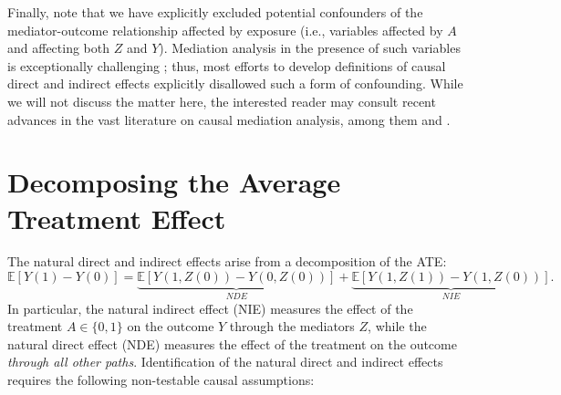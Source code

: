 \documentclass[
  12pt, krantz2,
]{krantz}
\theoremstyle{definition}
\theoremstyle{definition}
\theoremstyle{definition}
\newcommand{\E}{\mathbb{E}}
\newcommand{\1}{\mathbbm{1}}
\begin{document}
Finally, note that we have explicitly excluded potential confounders of the
mediator-outcome relationship affected by exposure (i.e., variables affected by
\(A\) and affecting both \(Z\) and \(Y\)). Mediation analysis in the presence of such
variables is exceptionally challenging \citep{avin2005identifiability}; thus, most
efforts to develop definitions of causal direct and indirect effects explicitly
disallowed such a form of confounding. While we will not discuss the matter
here, the interested reader may consult recent advances in the vast literature
on causal mediation analysis, among them \citet{diaz2020nonparametric} and
\citet{hejazi2021nonparametric}.

\hypertarget{decomposing-the-average-treatment-effect}{%
\section{Decomposing the Average Treatment Effect}\label{decomposing-the-average-treatment-effect}}

The natural direct and indirect effects arise from a decomposition of the ATE:
\begin{equation*}
  \E[Y(1) - Y(0)] =
    \underbrace{\E[Y(1, Z(0)) - Y(0, Z(0))]}_{NDE} +
    \underbrace{\E[Y(1, Z(1)) - Y(1, Z(0))]}_{NIE}.
\end{equation*}
In particular, the natural indirect effect (NIE) measures the effect of the
treatment \(A \in \{0, 1\}\) on the outcome \(Y\) through the mediators \(Z\), while
the natural direct effect (NDE) measures the effect of the treatment on the
outcome \emph{through all other paths}. Identification of the natural direct and
indirect effects requires the following non-testable causal assumptions:
\end{document}
